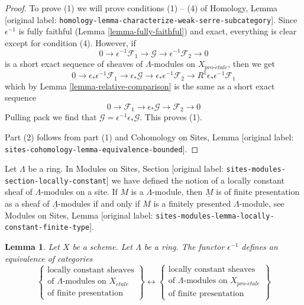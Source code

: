 \documentclass[10pt,a4paper]{article}
\theoremstyle{plain}
\newtheorem{lemma}[subsection]{Lemma}
\theoremstyle{definition}
\theoremstyle{remark}
\numberwithin{equation}{subsection}
\def\proetale{{pro\text{-}\acute{e}tale}}
\def\etale{{\acute{e}tale}}
\begin{document}
\begin{proof}
To prove (1) we will prove conditions (1) -- (4) of
Homology, Lemma \textnormal{[original label: \nolinkurl{homology-lemma-characterize-weak-serre-subcategory}]}.
Since $\epsilon^{-1}$ is fully faithful (Lemma \ref{lemma-fully-faithful})
and exact, everything is clear except for condition (4).
However, if
$$
0 \to \epsilon^{-1}\mathcal{F}_1 \to \mathcal{G} \to
\epsilon^{-1}\mathcal{F}_2 \to 0
$$
is a short exact sequence of sheaves of $\Lambda$-modules on $X_\proetale$,
then we get
$$
0 \to \epsilon_*\epsilon^{-1}\mathcal{F}_1 \to \epsilon_*\mathcal{G} \to
\epsilon_*\epsilon^{-1}\mathcal{F}_2 \to
R^1\epsilon_*\epsilon^{-1}\mathcal{F}_1
$$
which by Lemma \ref{lemma-relative-comparison}
is the same as a short exact sequence
$$
0 \to \mathcal{F}_1 \to \epsilon_*\mathcal{G} \to \mathcal{F}_2 \to 0
$$
Pulling pack we find that $\mathcal{G} = \epsilon^{-1}\epsilon_*\mathcal{G}$.
This proves (1).

\medskip\noindent
Part (2) follows from part (1) and Cohomology on Sites,
Lemma \textnormal{[original label: \nolinkurl{sites-cohomology-lemma-equivalence-bounded}]}.
\end{proof}

\noindent
Let $\Lambda$ be a ring. In
Modules on Sites, Section \textnormal{[original label: \nolinkurl{sites-modules-section-locally-constant}]}
we have defined the notion of a locally constant sheaf of $\Lambda$-modules
on a site. If $M$ is a $\Lambda$-module, then $\underline{M}$ is of finite
presentation as a sheaf of $\underline{\Lambda}$-modules if and only
if $M$ is a finitely presented $\Lambda$-module, see
Modules on Sites, Lemma \textnormal{[original label: \nolinkurl{sites-modules-lemma-locally-constant-finite-type}]}.

\begin{lemma}
\label{lemma-compare-locally-constant}
Let $X$ be a scheme. Let $\Lambda$ be a ring.
The functor $\epsilon^{-1}$ defines an equivalence of categories
$$
\left\{
\begin{matrix}
\text{locally constant sheaves}\\
\text{of }\Lambda\text{-modules on }X_\etale\\
\text{of finite presentation}
\end{matrix}
\right\}
\longleftrightarrow
\left\{
\begin{matrix}
\text{locally constant sheaves}\\
\text{of }\Lambda\text{-modules on }X_\proetale\\
\text{of finite presentation}
\end{matrix}
\right\}
$$
\end{lemma}
\end{document}
